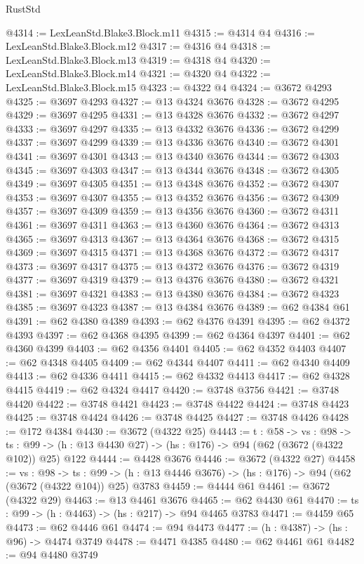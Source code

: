 \begin{lexlean}{RustStd}
\begin{coremodule}
{\begin{coremodule}
{{{{{{{{{{{@4314 := LexLeanStd.Blake3.Block.m11
@4315 := @4314 @4
@4316 := LexLeanStd.Blake3.Block.m12
@4317 := @4316 @4
@4318 := LexLeanStd.Blake3.Block.m13
@4319 := @4318 @4
@4320 := LexLeanStd.Blake3.Block.m14
@4321 := @4320 @4
@4322 := LexLeanStd.Blake3.Block.m15
@4323 := @4322 @4
@4324 := @3672 @4293
@4325 := @3697 @4293
@4327 := @13 @4324 @3676
@4328 := @3672 @4295
@4329 := @3697 @4295
@4331 := @13 @4328 @3676
@4332 := @3672 @4297
@4333 := @3697 @4297
@4335 := @13 @4332 @3676
@4336 := @3672 @4299
@4337 := @3697 @4299
@4339 := @13 @4336 @3676
@4340 := @3672 @4301
@4341 := @3697 @4301
@4343 := @13 @4340 @3676
@4344 := @3672 @4303
@4345 := @3697 @4303
@4347 := @13 @4344 @3676
@4348 := @3672 @4305
@4349 := @3697 @4305
@4351 := @13 @4348 @3676
@4352 := @3672 @4307
@4353 := @3697 @4307
@4355 := @13 @4352 @3676
@4356 := @3672 @4309
@4357 := @3697 @4309
@4359 := @13 @4356 @3676
@4360 := @3672 @4311
@4361 := @3697 @4311
@4363 := @13 @4360 @3676
@4364 := @3672 @4313
@4365 := @3697 @4313
@4367 := @13 @4364 @3676
@4368 := @3672 @4315
@4369 := @3697 @4315
@4371 := @13 @4368 @3676
@4372 := @3672 @4317
@4373 := @3697 @4317
@4375 := @13 @4372 @3676
@4376 := @3672 @4319
@4377 := @3697 @4319
@4379 := @13 @4376 @3676
@4380 := @3672 @4321
@4381 := @3697 @4321
@4383 := @13 @4380 @3676
@4384 := @3672 @4323
@4385 := @3697 @4323
@4387 := @13 @4384 @3676
@4389 := @62 @4384 @61
@4391 := @62 @4380 @4389
@4393 := @62 @4376 @4391
@4395 := @62 @4372 @4393
@4397 := @62 @4368 @4395
@4399 := @62 @4364 @4397
@4401 := @62 @4360 @4399
@4403 := @62 @4356 @4401
@4405 := @62 @4352 @4403
@4407 := @62 @4348 @4405
@4409 := @62 @4344 @4407
@4411 := @62 @4340 @4409
@4413 := @62 @4336 @4411
@4415 := @62 @4332 @4413
@4417 := @62 @4328 @4415
@4419 := @62 @4324 @4417
@4420 := @3748 @3756
@4421 := @3748 @4420
@4422 := @3748 @4421
@4423 := @3748 @4422
@4424 := @3748 @4423
@4425 := @3748 @4424
@4426 := @3748 @4425
@4427 := @3748 @4426
@4428 := @172 @4384
@4430 := @3672 (@4322 @25)
@4443 := {t : @58} ->
  {vs : @98} ->
  {ts : @99} -> (h : @13 @4430 @27) -> (hs : @176) -> @94 (@62 (@3672 (@4322 @102)) @25) @122
@4444 := @4428 @3676
@4446 := @3672 (@4322 @27)
@4458 := {vs : @98} ->
  {ts : @99} -> (h : @13 @4446 @3676) -> (hs : @176) -> @94 (@62 (@3672 (@4322 @104)) @25) @3783
@4459 := @4444 @61
@4461 := @3672 (@4322 @29)
@4463 := @13 @4461 @3676
@4465 := @62 @4430 @61
@4470 := {ts : @99} -> (h : @4463) -> (hs : @217) -> @94 @4465 @3783
@4471 := @4459 @65
@4473 := @62 @4446 @61
@4474 := @94 @4473
@4477 := (h : @4387) -> (hs : @96) -> @4474 @3749
@4478 := @4471 @4385
@4480 := @62 @4461 @61
@4482 := @94 @4480 @3749
}}}}}}}}}}}
\end{coremodule}}
\end{coremodule}
\end{lexlean}
